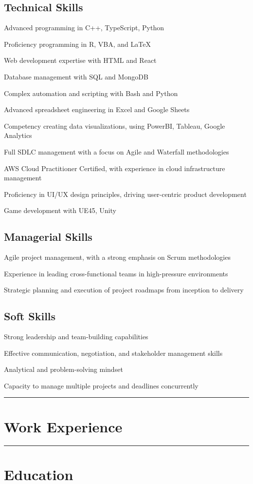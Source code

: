 \documentclass[10.75pt]{article}
\let\tempone\itemize
\let\temptwo\enditemize
\renewenvironment{itemize}{\tempone\addtolength{\itemsep}{-0.5\baselineskip}}{\temptwo}
\newcommand{\hr}{
	\par\noindent
	\vspace*{0pt}
	\rule{\textwidth}{1pt}
	\vspace*{-10pt}
}
\begin{document}
	\subsection*{Technical Skills}
	\begin{itemize}
		\item Advanced programming in C++, TypeScript, Python
		\item Proficiency programming in R, VBA, and LaTeX
		\item Web development expertise with HTML and React
		\item Database management with SQL and MongoDB
		\item Complex automation and scripting with Bash and Python
		\item Advanced spreadsheet engineering in Excel and Google Sheets
		\item Competency creating data visualizations, using PowerBI, Tableau, Google Analytics
		\item Full SDLC management with a focus on Agile and Waterfall methodologies
		\item AWS Cloud Practitioner Certified, with experience in cloud infrastructure management
		\item Proficiency in UI/UX design principles, driving user-centric product development
		\item Game development with \gls{UE45}, \gls{Unity}
	\end{itemize}

	\subsection*{Managerial Skills}
	\begin{itemize}
		\item Agile project management, with a strong emphasis on Scrum methodologies
		\item Experience in leading cross-functional teams in high-pressure environments
		\item Strategic planning and execution of project roadmaps from inception to delivery
	\end{itemize}

	\subsection*{Soft Skills}
	\begin{itemize}
		\item Strong leadership and team-building capabilities
		\item Effective communication, negotiation, and stakeholder management skills
		\item Analytical and problem-solving mindset
		\item Capacity to manage multiple projects and deadlines concurrently
	\end{itemize}

	\hr{}

	\section*{Work Experience}
	\workexperience{}

	\hr{}
	
	\section*{Education}
	\education{}
\end{document}
